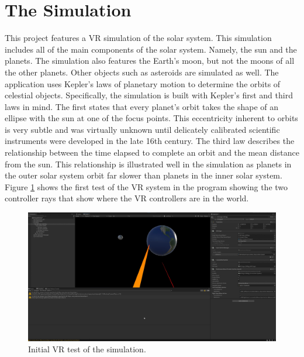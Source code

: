 \documentclass{article}
\begin{document}
    \section{The Simulation}
    This project features a VR simulation of the solar system. This simulation includes all of the main components of the solar system. Namely, the sun and the planets. The simulation also features the Earth's moon, but not the moons of all the other planets. Other objects such as asteroids are simulated as well. The application uses Kepler's laws of planetary motion to determine the orbits of celestial objects. Specifically, the simulation is built with Kepler's first and third laws in mind. The first states that every planet's orbit takes the shape of an ellipse with the sun at one of the focus points. This eccentricity inherent to orbits is very subtle and was virtually unknown until delicately calibrated scientific instruments were developed in the late 16th century. The third law describes the relationship between the time elapsed to complete an orbit and the mean distance from the sun. This relationship is illustrated well in the simulation as planets in the outer solar system orbit far slower than planets in the inner solar system.  Figure \ref{initialvr} shows the first test of the VR system in the program showing the two controller rays that show where the VR controllers are in the world.
    \begin{figure}[h]
        \centering
        \includegraphics[scale=0.25]{vr_test1.jpg}
        \caption{Initial VR test of the simulation.}
        \label{initialvr}
    \end{figure}
\end{document}
